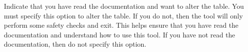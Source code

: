 \documentclass[letterpaper,10pt,english]{sphinxmanual}
\begin{document}
\begin{fulllineitems}
\label{\detokenize{mariadb-schema-change:cmdoption-mariadb-schema-change-execute}}
Indicate that you have read the documentation and want to alter the table.  You
must specify this option to alter the table. If you do not, then the tool will
only perform some safety checks and exit.  This helps ensure that you have read the
documentation and understand how to use this tool.  If you have not read the
documentation, then do not specify this option.

\end{fulllineitems}

\end{document}
